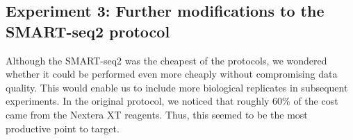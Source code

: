 \subsection{Experiment 3: Further modifications to the SMART-seq2 protocol}

Although the SMART-seq2 was the cheapest of the protocols, we wondered whether it could be performed even more cheaply without compromising data quality.  This would enable us to include more biological replicates in subsequent experiments.  In the original protocol, we noticed that roughly 60\% of the cost came from the Nextera XT reagents.  Thus, this seemed to be the most productive point to target.  

